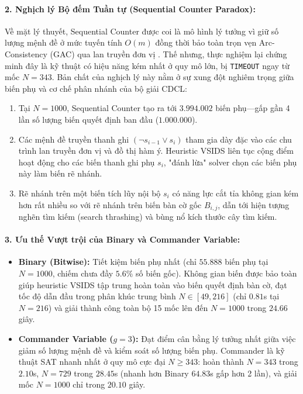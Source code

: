 \documentclass[a4paper,fleqn]{cas-sc}
\begin{document}
\paragraph{2. Nghịch lý Bộ đếm Tuần tự (Sequential Counter Paradox):}
Về mặt lý thuyết, Sequential Counter được coi là mô hình lý tưởng vì giữ số lượng mệnh đề ở mức tuyến tính $O(m)$ đồng thời bảo toàn trọn vẹn Arc-Consistency (GAC) qua lan truyền đơn vị \cite{sinz2005towards}. Thế nhưng, thực nghiệm lại chứng minh đây là kỹ thuật có hiệu năng kém nhất ở quy mô lớn, bị \texttt{TIMEOUT} ngay từ mốc $N = 343$. Bản chất của nghịch lý này nằm ở sự xung đột nghiêm trọng giữa biến phụ và cơ chế phân nhánh của bộ giải CDCL:
\begin{enumerate}
    \item Tại $N = 1000$, Sequential Counter tạo ra tới $3.994.002$ biến phụ---gấp gần 4 lần số lượng biến quyết định ban đầu ($1.000.000$).
    \item Các mệnh đề truyền thanh ghi $(\neg s_{i-1} \lor s_i)$ tham gia dày đặc vào các chu trình lan truyền đơn vị và đồ thị hàm ý. Heuristic VSIDS liên tục cộng điểm hoạt động cho các biến thanh ghi phụ $s_i$, "đánh lừa" solver chọn các biến phụ này làm biến rẽ nhánh.
    \item Rẽ nhánh trên một biến tích lũy nội bộ $s_i$ có năng lực cắt tỉa không gian kém hơn rất nhiều so với rẽ nhánh trên biến bàn cờ gốc $B_{i,j}$, dẫn tới hiện tượng nghẽn tìm kiếm (search thrashing) và bùng nổ kích thước cây tìm kiếm.
\end{enumerate}

\paragraph{3. Ưu thế Vượt trội của Binary và Commander Variable:}
\begin{itemize}
    \item \textbf{Binary (Bitwise):} Tiết kiệm biến phụ nhất (chỉ $55.888$ biến phụ tại $N = 1000$, chiếm chưa đầy $5.6\%$ số biến gốc). Không gian biến được bảo toàn giúp heuristic VSIDS tập trung hoàn toàn vào biến quyết định bàn cờ, đạt tốc độ dẫn đầu trong phân khúc trung bình $N \in [49, 216]$ (chỉ $0.81$s tại $N=216$) và giải thành công toàn bộ 15 mốc lên đến $N = 1000$ trong $24.66$ giây.
    \item \textbf{Commander Variable ($g=3$):} Đạt điểm cân bằng lý tưởng nhất giữa việc giảm số lượng mệnh đề và kiểm soát số lượng biến phụ. Commander là kỹ thuật SAT nhanh nhất ở quy mô cực đại $N \ge 343$: hoàn thành $N = 343$ trong $2.10$s, $N = 729$ trong $28.45$s (nhanh hơn Binary $64.83$s gấp hơn 2 lần), và giải mốc $N = 1000$ chỉ trong $20.10$ giây.
\end{itemize}
\end{document}
